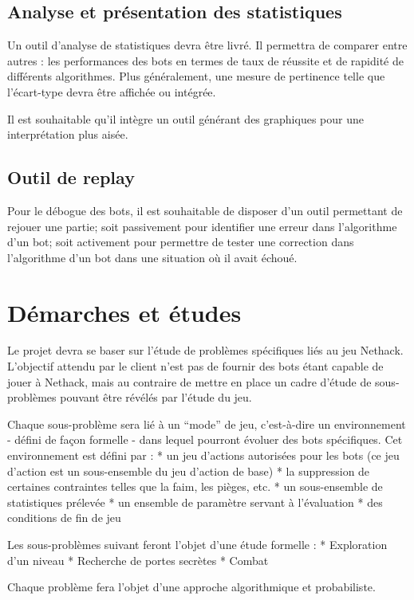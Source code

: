 \documentclass[12pt]{article}
\begin{document}
\subsection{Analyse et présentation des statistiques}

Un outil d'analyse de statistiques devra être livré. Il permettra de
comparer entre autres : les performances des bots en termes de taux de
réussite et de rapidité de différents algorithmes. Plus généralement,
une mesure de pertinence telle que l'écart-type devra être affichée ou
intégrée.

Il est souhaitable qu'il intègre un outil générant des graphiques pour
une interprétation plus aisée.

\subsection{Outil de replay}

Pour le débogue des bots, il est souhaitable de disposer d'un outil
permettant de rejouer une partie; soit passivement pour identifier une
erreur dans l'algorithme d'un bot; soit activement pour permettre de
tester une correction dans l'algorithme d'un bot dans une situation où
il avait échoué.

\section{Démarches et études}

Le projet devra se baser sur l'étude de problèmes spécifiques liés au
jeu Nethack. L'objectif attendu par le client n'est pas de fournir des
bots étant capable de jouer à Nethack, mais au contraire de mettre en
place un cadre d'étude de sous-problèmes pouvant être révélés par
l'étude du jeu.

Chaque sous-problème sera lié à un ``mode'' de jeu, c'est-à-dire un
environnement - défini de façon formelle - dans lequel pourront évoluer
des bots spécifiques. Cet environnement est défini par : * un jeu
d'actions autorisées pour les bots (ce jeu d'action est un sous-ensemble
du jeu d'action de base) * la suppression de certaines contraintes
telles que la faim, les pièges, etc. * un sous-ensemble de statistiques
prélevée * un ensemble de paramètre servant à l'évaluation * des
conditions de fin de jeu

Les sous-problèmes suivant feront l'objet d'une étude formelle : *
Exploration d'un niveau * Recherche de portes secrètes * Combat

Chaque problème fera l'objet d'une approche algorithmique et
probabiliste.
\end{document}
